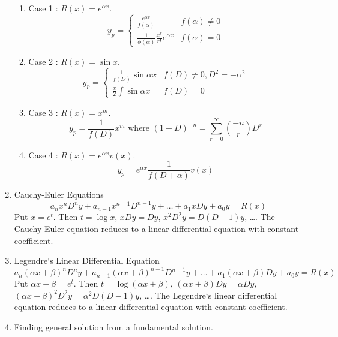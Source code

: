 \begin{enumerate}
	\begin{enumerate}
		\item Case 1 : $R(x) = e^{\alpha x}$.
			$$ y_p = \begin{cases} \frac{e^{\alpha x}}{f(\alpha)} & f(\alpha) \ne 0 \\ \frac{1}{\phi(\alpha)} \frac{x^r}{r!} e^{\alpha x} & f(\alpha) = 0 \end{cases} $$
		\item Case 2 : $R(x) = \sin x$.
			$$ y_p = \begin{cases} \frac{1}{f(D)} \sin \alpha x & f(D) \ne 0, D^2 = -\alpha^2\\ \frac{x}{2} \int \sin \alpha x & f(D) = 0 \end{cases} $$
		\item Case 3 : $R(x) = x^m$.
			$$ y_p = \frac{1}{f(D)} x^m  \text{ where } (1-D)^{-n} = \sum_{r = 0}^\infty \binom{-n}{r} D^r $$
		\item Case 4 : $R(x) = e^{\alpha x} v(x)$.
			$$ y_p = e^{\alpha x} \frac{1}{f(D+\alpha)} v(x)$$
	\end{enumerate}
\item Cauchy-Euler Equations
\begin{equation}
	a_n x^n D^n y + a_{n-1} x^{n-1} D^{n-1} y + \dots + a_1 x Dy + a_0 y = R(x)
\end{equation}
		Put $x = e^t$. Then $t = \log x$, $x Dy = Dy$, $x^2 D^2 y = D(D-1)y$, \dots. 
		The Cauchy-Euler equation reduces to a linear differential equation with constant coefficient.
	\item Legendre`s Linear Differential Equation
\begin{equation}
	a_n (\alpha x + \beta)^n D^n y + a_{n-1} (\alpha x + \beta)^{n-1} D^{n-1} y + \dots + a_1 (\alpha x + \beta) Dy + a_0 y = R(x)
\end{equation}
		Put $\alpha x + \beta = e^t$. Then $t = \log (\alpha x + \beta)$, $(\alpha x + \beta) Dy = \alpha Dy$, $(\alpha x + \beta)^2 D^2y = \alpha^2 D(D-1)y$, \dots.
		The Legendre`s linear differential equation reduces to a linear differential equation with constant coefficient.
	\item Finding general solution from a fundamental solution.
\end{enumerate}
